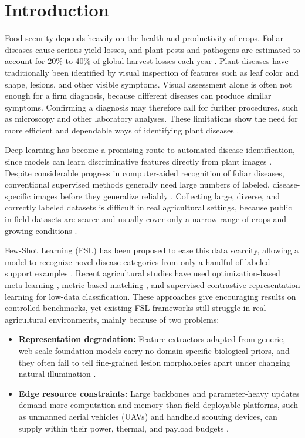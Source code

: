 \documentclass[conference]{IEEEtran}
\begin{document}
\section{Introduction}
Food security depends heavily on the health and productivity of crops. Foliar diseases cause serious yield losses, and plant pests and pathogens are estimated to account for 20\% to 40\% of global harvest losses each year \cite{richard2022control}. Plant diseases have traditionally been identified by visual inspection of features such as leaf color and shape, lesions, and other visible symptoms. Visual assessment alone is often not enough for a firm diagnosis, because different diseases can produce similar symptoms. Confirming a diagnosis may therefore call for further procedures, such as microscopy and other laboratory analyses. These limitations show the need for more efficient and dependable ways of identifying plant diseases \cite{khakimov2022traditional}.

Deep learning has become a promising route to automated disease identification, since models can learn discriminative features directly from plant images \cite{shoaib2023advanced}. Despite considerable progress in computer-aided recognition of foliar diseases, conventional supervised methods generally need large numbers of labeled, disease-specific images before they generalize reliably \cite{shoaib2023advanced}. Collecting large, diverse, and correctly labeled datasets is difficult in real agricultural settings, because public in-field datasets are scarce and usually cover only a narrow range of crops and growing conditions \cite{shafik2023systematic}.

Few-Shot Learning (FSL) has been proposed to ease this data scarcity, allowing a model to recognize novel disease categories from only a handful of labeled support examples \cite{sun2024few}. Recent agricultural studies have used optimization-based meta-learning \cite{finn2017maml, sun2024few}, metric-based matching \cite{yang2024laboratory, zhao2024mafde}, and supervised contrastive representation learning \cite{mu2024few} for low-data classification. These approaches give encouraging results on controlled benchmarks, yet existing FSL frameworks still struggle in real agricultural environments, mainly because of two problems:
\begin{itemize}
    \item \textbf{Representation degradation:} Feature extractors adapted from generic, web-scale foundation models carry no domain-specific biological priors, and they often fail to tell fine-grained lesion morphologies apart under changing natural illumination \cite{yang2024laboratory}.
    \item \textbf{Edge resource constraints:} Large backbones and parameter-heavy updates demand more computation and memory than field-deployable platforms, such as unmanned aerial vehicles (UAVs) and handheld scouting devices, can supply within their power, thermal, and payload budgets \cite{radocaj2025evolution}.
\end{itemize}
\end{document}
